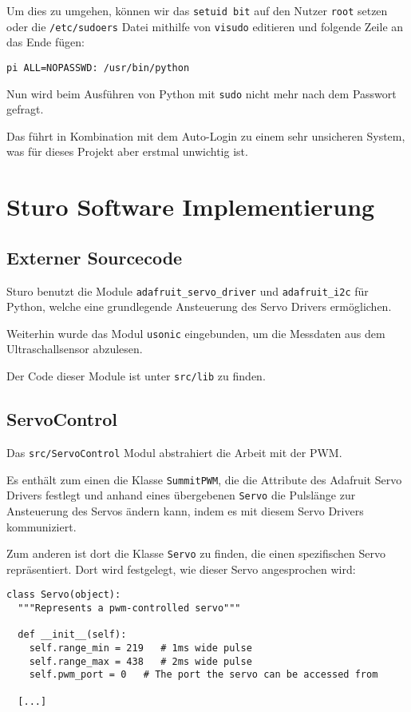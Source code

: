 \documentclass[a4paper,10pt]{scrartcl}
\begin{document}
    Um dies zu umgehen, können wir das \lstinline{setuid bit} auf den Nutzer
    \lstinline{root} setzen oder die \lstinline{/etc/sudoers} Datei mithilfe von
    \lstinline{visudo} editieren und folgende Zeile an das Ende fügen:
    \begin{lstlisting}
pi ALL=NOPASSWD: /usr/bin/python
    \end{lstlisting}

    Nun wird beim Ausführen von Python mit \lstinline{sudo} nicht mehr nach dem
    Passwort gefragt.

    Das führt in Kombination mit dem Auto-Login zu einem sehr unsicheren System,
    was für dieses Projekt aber erstmal unwichtig ist.

\section{Sturo Software Implementierung}

  \subsection{Externer Sourcecode}
    Sturo benutzt die Module \lstinline{adafruit_servo_driver} und
    \lstinline{adafruit_i2c} für Python, welche eine grundlegende Ansteuerung
    des Servo Drivers ermöglichen. \cite{adafruitlearn}

    Weiterhin wurde das Modul \lstinline{usonic} eingebunden, um die Messdaten
    aus dem Ultraschallsensor abzulesen. \cite{ultrasonic}

    Der Code dieser Module ist unter \lstinline{src/lib} zu finden.

  \subsection{ServoControl}

    Das \lstinline{src/ServoControl} Modul abstrahiert die Arbeit mit der PWM.

    Es enthält zum einen die Klasse \lstinline{SummitPWM}, die die Attribute des
    Adafruit Servo Drivers festlegt und anhand eines übergebenen
    \lstinline{Servo} die Pulslänge zur Ansteuerung des Servos ändern kann,
    indem es mit diesem Servo Drivers kommuniziert.

    Zum anderen ist dort die Klasse \lstinline{Servo} zu finden, die einen
    spezifischen Servo repräsentiert.
    Dort wird festgelegt, wie dieser Servo angesprochen wird:
    \begin{lstlisting}
class Servo(object):
  """Represents a pwm-controlled servo"""

  def __init__(self):
    self.range_min = 219   # 1ms wide pulse
    self.range_max = 438   # 2ms wide pulse
    self.pwm_port = 0   # The port the servo can be accessed from

  [...]
    \end{lstlisting}
\end{document}
